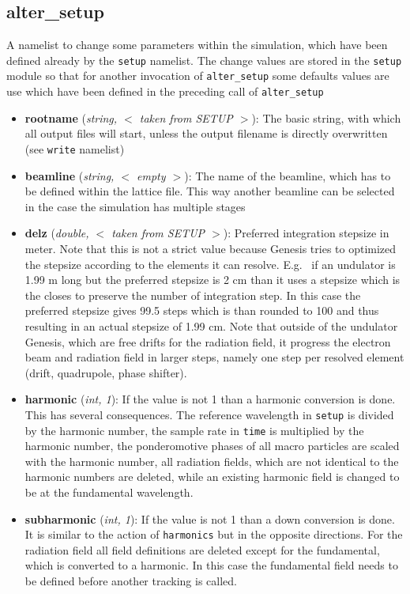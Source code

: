 \documentclass[12pt]{book}
\begin{document}
\subsection{\sf alter\_setup}

A namelist to change some parameters within the simulation, which have been defined already by the {\tt setup} namelist. The change values are stored in the {\tt setup} module so that for another invocation of {\tt alter\_setup} some defaults values are use which have been defined in the preceding call of {\tt alter\_setup}

\begin{itemize}

\item {\bf rootname} ({\it string, $<$ taken from SETUP $>$}): The basic string, with which all output files will start, unless the output filename is directly overwritten (see {\tt write} namelist)
\item{\bf beamline} ({\it string, $<$ empty $>$}): The name of the beamline, which has to be defined within the lattice file. This way another beamline can be selected in the case the simulation has multiple stages
\item {\bf delz} ({\it double, $<$ taken from SETUP $>$}): Preferred integration stepsize in meter. Note that this is not a strict value because Genesis tries to optimized the stepsize according to the elements it can resolve. E.g.~ if an undulator is 1.99 m long but the preferred stepsize is 2 cm than it uses a stepsize which is the closes to preserve the number of integration step. In this case the preferred stepsize gives 99.5 steps which is than rounded to 100 and thus resulting in an actual stepsize of 1.99 cm.  Note that outside of the undulator Genesis, which are free drifts for the radiation field, it progress the electron beam and radiation field in larger steps, namely one step per resolved element (drift, quadrupole, phase shifter).
\item {\bf harmonic} ({\it int, 1}): If the value is not 1 than a harmonic conversion is done. This has several consequences. The reference wavelength in {\tt setup} is divided by the harmonic number, the sample rate in  {\tt time} is multiplied by the harmonic number, the ponderomotive phases of all macro particles are scaled with the harmonic number, all radiation fields, which are not identical to the harmonic numbers are deleted, while an existing harmonic field is changed to be at the fundamental wavelength.

\item {\bf subharmonic} ({\it int, 1}): If the value is not 1 than a down conversion is done. It is similar to the action of {\tt harmonics} but in the opposite directions. For the radiation field all field definitions are deleted except for the fundamental, which is converted to a harmonic. In this case the fundamental field needs to be defined before another tracking is called.


\end{itemize}
\end{document}
